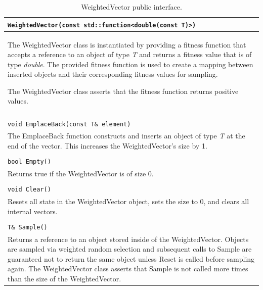 \documentclass[12pt]{article}
\begin{document}
  \begin{table}[htbp]
    \label{tab:wvpub}
    \caption{WeightedVector public interface.}
    \begin{tabular}{ | p{1.0\linewidth} | }
      \hline
      \verb|WeightedVector(const std::function<double(const T)>)| \\ \hline
      The WeightedVector class is instantiated by providing a fitness function
      that accepts a reference to an object of type \emph{T} and returns a
      fitness value that is of type \emph{double}. The provided fitness function
      is used to create a mapping between inserted objects and their
      corresponding fitness values for sampling.

      The WeightedVector class asserts that the fitness function returns positive
      values. \\ \hline

      \\ \hline

      \verb|void EmplaceBack(const T& element)| \\ \hline
      The EmplaceBack function constructs and inserts an object of type
      \emph{T} at the end of the vector. This increases the WeightedVector's
      size by 1. \\ \hline

      \\ \hline

      \verb|bool Empty()| \\ \hline
      Returns true if the WeightedVector is of size 0. \\  \hline

      \\ \hline

      \verb|void Clear()| \\ \hline
      Resets all state in the WeightedVector object, sets the size to 0, and
      clears all internal vectors. \\ \hline

      \\ \hline

      \verb|T& Sample()|\\ \hline

      Returns a reference to an object stored inside of the WeightedVector.
      Objects are sampled via weighted random selection and subsequent calls to
      Sample are guaranteed not to return the same object unless Reset is called
      before sampling again. The WeightedVector class asserts that Sample is not
      called more times than the size of the WeightedVector.\\ \hline


\end{tabular}
\end{table}
\end{document}
